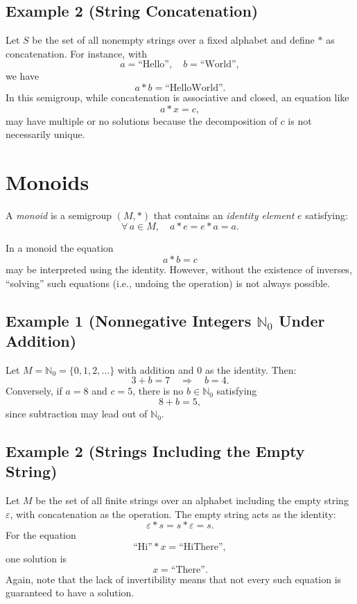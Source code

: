 \documentclass[11pt,openany]{article}
\begin{document}
\subsection*{Example 2 (String Concatenation)}
Let \(S\) be the set of all nonempty strings over a fixed alphabet and define \(\ast\) as concatenation. For instance, with
\[
a = \text{``Hello''}, \quad b = \text{``World''},
\]
we have
\[
a \ast b = \text{``HelloWorld''}.
\]
In this semigroup, while concatenation is associative and closed, an equation like
\[
a \ast x = c,
\]
may have multiple or no solutions because the decomposition of \(c\) is not necessarily unique.

\section{Monoids}
\begin{definition}[Monoid]
	A \emph{monoid} is a semigroup \((M,\ast)\) that contains an \emph{identity element} \(e\) satisfying:
	\[
	\forall\, a \in M,\quad a\ast e = e\ast a = a.
	\]
\end{definition}

In a monoid the equation
\[
a\ast b = c
\]
may be interpreted using the identity. However, without the existence of inverses, “solving” such equations (i.e., undoing the operation) is not always possible.

\subsection*{Example 1 (Nonnegative Integers \(\mathbb{N}_0\) Under Addition)}
Let \(M=\mathbb{N}_0 = \{0,1,2,\dots\}\) with addition and \(0\) as the identity. Then:
\[
3+b=7 \quad \Longrightarrow \quad b=4.
\]
Conversely, if \(a=8\) and \(c=5\), there is no \(b\in \mathbb{N}_0\) satisfying
\[
8+b=5,
\]
since subtraction may lead out of \(\mathbb{N}_0\).

\subsection*{Example 2 (Strings Including the Empty String)}
Let \(M\) be the set of all finite strings over an alphabet including the empty string \(\varepsilon\), with concatenation as the operation. The empty string acts as the identity:
\[
\varepsilon \ast s = s \ast \varepsilon = s.
\]
For the equation
\[
\text{``Hi''} \ast x = \text{``HiThere''},
\]
one solution is
\[
x = \text{``There''}.
\]
Again, note that the lack of invertibility means that not every such equation is guaranteed to have a solution.
\end{document}
